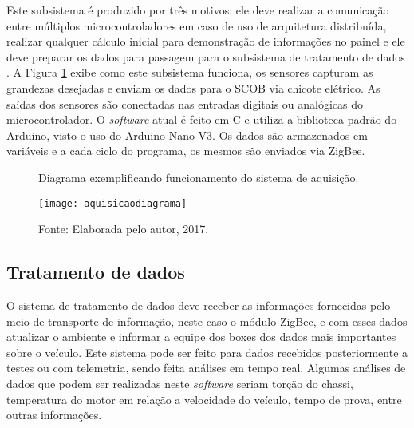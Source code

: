 Este subsistema é produzido por três motivos: ele deve realizar a comunicação entre múltiplos microcontroladores em caso de uso de arquitetura distribuída, realizar qualquer cálculo inicial para demonstração de informações no painel e ele deve preparar os dados para passagem para o subsistema de tratamento de dados \cite{racecarInstrumentationFor2012}\cite{projetoMiniBaja2006}\cite{designAndImplementation2015}\cite{Dias2010}\cite{Nunes2016}. A Figura \ref{fig:aquisicaodiagrama} exibe como este subsistema funciona, os sensores capturam as grandezas desejadas e enviam os dados para o SCOB via chicote elétrico. As saídas dos sensores são conectadas nas entradas digitais ou analógicas do microcontrolador. O \textit{software} atual é feito em C e utiliza a biblioteca padrão do Arduino, visto o uso do Arduino Nano V3. Os dados são armazenados em variáveis e a cada ciclo do programa, os mesmos são enviados via ZigBee.      

\begin{figure}[!htb]
	\centering
		\caption{Diagrama exemplificando funcionamento do sistema de aquisição.}
		\texttt{[image: aquisicaodiagrama]} 
		\caption*{Fonte: Elaborada pelo autor, 2017.}
		\label{fig:aquisicaodiagrama}
\end{figure} 


\subsection{Tratamento de dados}

O sistema de tratamento de dados deve receber as informações fornecidas pelo meio de transporte de informação, neste caso o módulo ZigBee, e com esses dados atualizar o ambiente e informar a equipe dos boxes dos dados mais importantes sobre o veículo. Este sistema pode ser feito para dados recebidos posteriormente a testes ou com telemetria, sendo feita análises em tempo real. Algumas análises de dados que podem ser realizadas neste \textit{software} seriam torção do chassi, temperatura do motor em relação a velocidade do veículo, tempo de prova, entre outras informações. 

